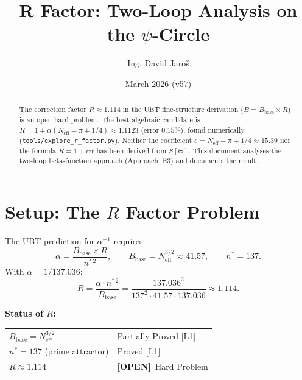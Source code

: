 \documentclass[11pt,a4paper]{article}
\title{\textbf{R Factor: Two-Loop Analysis on the $\psi$-Circle}}
\author{Ing. David Jaroš}
\date{March 2026 (v57)}
\theoremstyle{remark}
\newcommand{\OPEN}{\textbf{[OPEN]}}
\begin{document}
\maketitle

\begin{abstract}
The correction factor $R \approx 1.114$ in the UBT fine-structure derivation
($B = B_{\mathrm{base}} \times R$) is an open hard problem.  The best
algebraic candidate is $R = 1 + \alpha(N_{\mathrm{eff}} + \pi + 1/4) \approx 1.1123$
(error $0.15\%$), found numerically (\texttt{tools/explore\_r\_factor.py}).  Neither
the coefficient $c = N_{\mathrm{eff}} + \pi + 1/4 \approx 15.39$ nor the formula
$R = 1 + c\alpha$ has been derived from $\mathcal{S}[\Theta]$.  This document
analyses the two-loop beta-function approach (Approach~B3) and documents the
result.
\end{abstract}

\section{Setup: The $R$ Factor Problem}
\label{sec:setup}

The UBT prediction for $\alpha^{-1}$ requires:
\begin{equation}
  \alpha = \frac{B_{\mathrm{base}} \times R}{n^{*\,2}},
  \qquad
  B_{\mathrm{base}} = N_{\mathrm{eff}}^{3/2} \approx 41.57,
  \qquad n^* = 137.
  \label{eq:alpha_formula}
\end{equation}
With $\alpha = 1/137.036$:
\begin{equation}
  R = \frac{\alpha \cdot n^{*\,2}}{B_{\mathrm{base}}}
    = \frac{137.036^2}{137^2 \cdot 41.57 \cdot 137.036}
    \approx 1.114.
  \label{eq:R_target}
\end{equation}

\noindent\textbf{Status of $R$:}
\begin{center}
\begin{tabular}{|l|l|}
\hline
$B_{\mathrm{base}} = N_{\mathrm{eff}}^{3/2}$ & Partially Proved [L1] \\
$n^* = 137$ (prime attractor) & Proved [L1] \\
$R \approx 1.114$ & \OPEN\ Hard Problem \\
\hline
\end{tabular}
\end{center}

\end{document}

